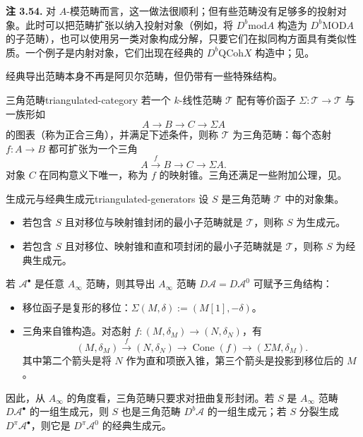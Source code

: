 \begin{note}\label{note:derived-category-projectives}
\textbf{注 3.54.} 对 $A$-模范畴而言，这一做法很顺利；但有些范畴没有足够多的投射对象。此时可以把范畴扩张以纳入投射对象（例如，将 $D^b\mathrm{mod}A$ 构造为 $D^b\mathrm{MOD}A$ 的子范畴），也可以使用另一类对象构成分解，只要它们在拟同构方面具有类似性质。一个例子是内射对象，它们出现在经典的 $D^b\mathrm{QCoh}X$ 构造中；见。
\end{note}

经典导出范畴本身不再是阿贝尔范畴，但仍带有一些特殊结构。
\begin{definition}{三角范畴}{triangulated-category}
若一个 $k$-线性范畴 $\mathcal T$ 配有等价函子 $\Sigma\colon\mathcal T\to\mathcal T$ 与一族形如
\[
  A\longrightarrow B\longrightarrow C\longrightarrow\Sigma A
\]
的图表（称为正合三角），并满足下述条件，则称 $\mathcal T$ 为三角范畴：每个态射 $f\colon A\to B$ 都可扩张为一个三角
\[
  A\xrightarrow{f}B\longrightarrow C\longrightarrow\Sigma A.
\]
对象 $C$ 在同构意义下唯一，称为 $f$ 的映射锥。三角还满足一些附加公理，见。
\end{definition}

\begin{definition}{生成元与经典生成元}{triangulated-generators}
设 $S$ 是三角范畴 $\mathcal T$ 中的对象集。
\begin{itemize}
  \item 若包含 $S$ 且对移位与映射锥封闭的最小子范畴就是 $\mathcal T$，则称 $S$ 为生成元。
  \item 若包含 $S$ 且对移位、映射锥和直和项封闭的最小子范畴就是 $\mathcal T$，则称 $S$ 为经典生成元。
\end{itemize}
\end{definition}

若 $\mathcal A^\bullet$ 是任意 $A_\infty$ 范畴，则其导出 $A_\infty$ 范畴 $D\mathcal A=D\mathcal A^0$ 可赋予三角结构：
\begin{itemize}
  \item 移位函子是复形的移位：$\Sigma(M,\delta):=(M[1],-\delta)$。
  \item 三角来自锥构造。对态射 $f\colon(M,\delta_M)\to(N,\delta_N)$，有
  \[
    (M,\delta_M)\xrightarrow{f}(N,\delta_N)
    \longrightarrow\operatorname{Cone}(f)
    \longrightarrow(\Sigma M,\delta_M).
  \]
  其中第二个箭头是将 $N$ 作为直和项嵌入锥，第三个箭头是投影到移位后的 $M$。
\end{itemize}
因此，从 $A_\infty$ 的角度看，三角范畴只要求对扭曲复形封闭。若 $S$ 是 $A_\infty$ 范畴 $D\mathcal A^\bullet$ 的一组生成元，则 $S$ 也是三角范畴 $D^b\mathcal A$ 的一组生成元；若 $S$ 分裂生成 $D^\pi\mathcal A^\bullet$，则它是 $D^\pi\mathcal A^0$ 的经典生成元。

